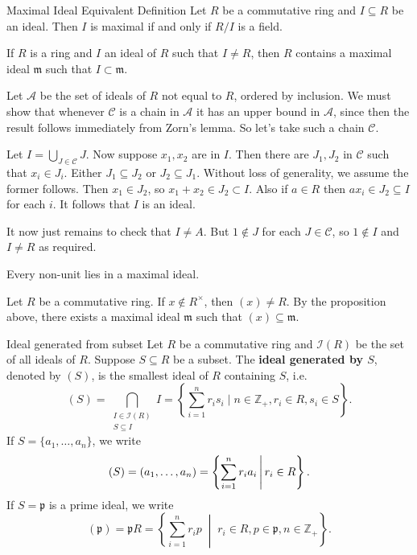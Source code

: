 \begin{proposition}{Maximal Ideal Equivalent Definition}{}
    Let $R$ be a commutative ring and $I\subseteq R$ be an ideal. Then $I$ is maximal if and only if $R/I$ is a field.  
\end{proposition}

\begin{proposition}{}{}
    If $R$ is a ring and $I$ an ideal of $R$ such that $I \neq R$, then $R$ contains a maximal ideal $\mathfrak{m}$ such that $I \subset \mathfrak{m}$.
\end{proposition}

\begin{prf}
    Let $\mathcal{A}$ be the set of ideals of $R$ not equal to $R$, ordered by inclusion. We must show that whenever $\mathcal{C}$ is a chain in $\mathcal{A}$ it has an upper bound in $\mathcal{A}$, since then the result follows immediately from Zorn's lemma. So let's take such a chain $\mathcal{C}$.

Let $I=\bigcup_{J \in \mathcal{C}} J$. Now suppose $x_1, x_2$ are in $I$. Then there are $J_1, J_2$ in $\mathcal{C}$ such that $x_i \in J_i$. Either $J_1 \subseteq J_2$ or $J_2 \subseteq J_1$. Without loss of generality, we assume the former follows. Then $x_1 \in J_2$, so $x_1+x_2 \in J_2 \subset I$. Also if $a \in R$ then $a x_i \in J_2 \subseteq I$ for each $i$. It follows that $I$ is an ideal.

It now just remains to check that $I \neq A$. But $1 \notin J$ for each $J \in \mathcal{C}$, so $1 \notin I$ and $I \neq R$ as required.
\end{prf}

\begin{corollary}{}{}
    Every non-unit lies in a maximal ideal.
\end{corollary}

\begin{prf}
    Let $R$ be a commutative ring. If $x\notin R^{\times}$, then $(x)\ne R$. By the proposition above, there exists a maximal ideal $\mathfrak{m}$ such that $(x)\subseteq \mathfrak{m}$.
\end{prf}

\begin{definition}{Ideal generated from subset}{}
    Let $R$ be a commutative ring and $\mathcal I(R)$ be the set of all ideals of $R$. Suppose $S\subseteq R$ be a subset. The \textbf{ideal generated by $S$}, denoted by $(S)$, is the smallest ideal of $R$ containing $S$, i.e. 
    \[
        (S)=\bigcap_{\substack{ I\in \mathcal I(R)\\S\subseteq I}}I=\left\{\sum_{i=1}^n r_is_i\mid n\in\mathbb{Z}_{+},r_i\in R,s_i\in S\right\}.
    \]
    If $S=\{a_1,\dots,a_n\}$, we write 
    \[
        (S)=(a_1,\dots,a_n)=\left\{\sum_{i=1}^n r_ia_i\,\middle\vert\,  r_i\in R\right\}.
    \]
    If $S=\mathfrak{p}$ is a prime ideal, we write 
    \[
    (\mathfrak{p})=\mathfrak{p}R = \left\{ \sum_{i=1}^n r_i p \;\middle|\; r_i \in R, p \in \mathfrak{p}, n \in \mathbb{Z}_{+} \right\}.
    \]
\end{definition}


